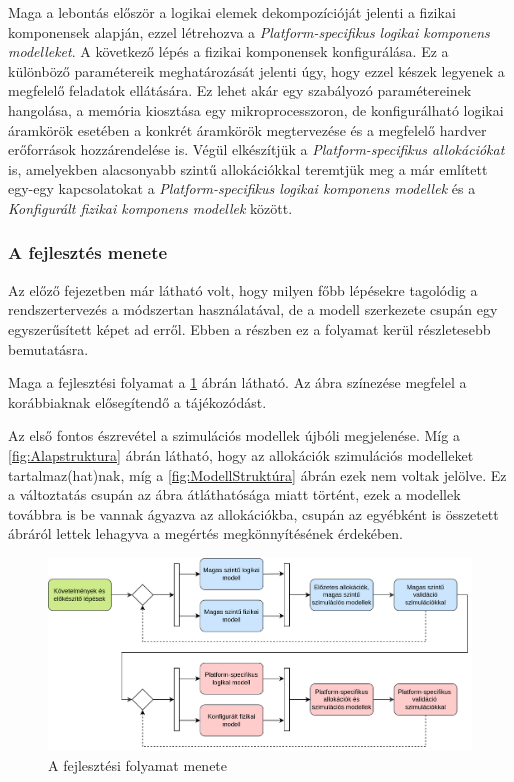         Maga a lebontás először a logikai elemek dekompozícióját jelenti a fizikai komponensek alapján, ezzel létrehozva a \emph{Platform-specifikus logikai komponens modelleket}.
        A következő lépés a fizikai komponensek konfigurálása. Ez a különböző paramétereik meghatározását jelenti úgy, hogy ezzel készek legyenek a megfelelő feladatok ellátására.
        Ez lehet akár egy szabályozó paramétereinek hangolása, a memória kiosztása egy mikroprocesszoron, de konfigurálható logikai áramkörök esetében a konkrét áramkörök megtervezése és a megfelelő hardver erőforrások hozzárendelése is.
        Végül elkészítjük a \emph{Platform-specifikus allokációkat} is, amelyekben alacsonyabb szintű allokációkkal teremtjük meg a már említett egy-egy kapcsolatokat a \emph{Platform-specifikus logikai komponens modellek} és a \emph{Konfigurált fizikai komponens modellek} között.

        \subsubsection{A fejlesztés menete} \label{sec:flow}
        Az előző fejezetben már látható volt, hogy milyen főbb lépésekre tagolódig a rendszertervezés a módszertan használatával, de a modell szerkezete csupán egy egyszerűsített képet ad erről.
        Ebben a részben ez a folyamat kerül részletesebb bemutatásra.
        
        Maga a fejlesztési folyamat a \ref{fig:Folyamat} ábrán látható. Az ábra színezése megfelel a korábbiaknak elősegítendő a tájékozódást.

        Az első fontos észrevétel a szimulációs modellek újbóli megjelenése. Míg a \ref{fig:Alapstruktura} ábrán látható, hogy az allokációk szimulációs modelleket tartalmaz(hat)nak, míg a \ref{fig:ModellStruktúra} ábrán ezek nem voltak jelölve.
        Ez a változtatás csupán az ábra átláthatósága miatt történt, ezek a modellek továbbra is be vannak ágyazva az allokációkba, csupán az egyébként is összetett ábráról lettek lehagyva a megértés megkönnyítésének érdekében.

        \begin{figure}[!ht]
            \centering
            \includegraphics[width=150mm, keepaspectratio]{figures/ParalelAllocationBasedFlowHU.drawio.png}
            \caption{A fejlesztési folyamat menete} 
            \label{fig:Folyamat}
        \end{figure}

